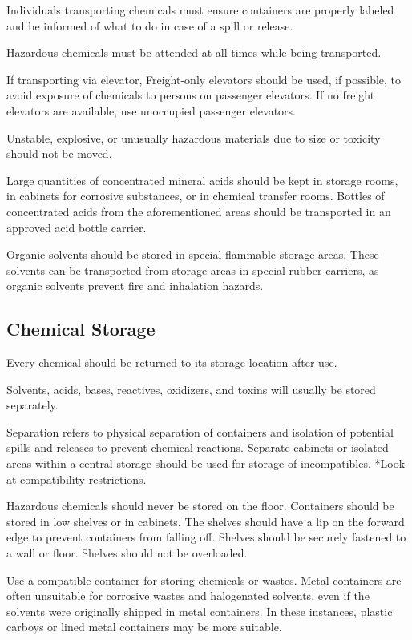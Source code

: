 \documentclass[12pt]{../SOP2}
\begin{document}
\NP Individuals transporting chemicals must ensure containers are properly labeled and be informed of what to do in case of a spill or release. 

\NP Hazardous chemicals must be attended at all times while being transported.

If transporting via elevator, Freight-only elevators should be used, if possible, to avoid exposure of chemicals to persons on passenger elevators. If no freight elevators are available, use unoccupied passenger elevators.  

Unstable, explosive, or unusually hazardous materials due to size or toxicity should not be moved. 

Large quantities of concentrated mineral acids should be kept in storage rooms, in cabinets for corrosive substances, or in chemical transfer rooms. Bottles of concentrated acids from the aforementioned areas should be transported in an approved acid bottle carrier. 

Organic solvents should be stored in special flammable storage areas. These solvents can be transported from storage areas in special rubber carriers, as organic solvents prevent fire and inhalation hazards. 

\subsection{Chemical Storage}

Every chemical should be returned to its storage location after use. 

Solvents, acids, bases, reactives, oxidizers, and toxins will usually be stored separately.

Separation refers to physical separation of containers and isolation of potential spills and releases to prevent chemical reactions. Separate cabinets or isolated areas within a central storage should be used for storage of incompatibles. *Look at compatibility restrictions. 

Hazardous chemicals should never be stored on the floor. Containers should be stored in low shelves or in cabinets. The shelves should have a lip on the forward edge to prevent containers from falling off. Shelves should be securely fastened to a wall or floor. Shelves should not be overloaded.

Use a compatible container for storing chemicals or wastes. Metal containers are often unsuitable for corrosive wastes and halogenated solvents, even if the solvents were originally shipped in metal containers. In these instances, plastic carboys or lined metal containers may be more suitable. 
\end{document}
